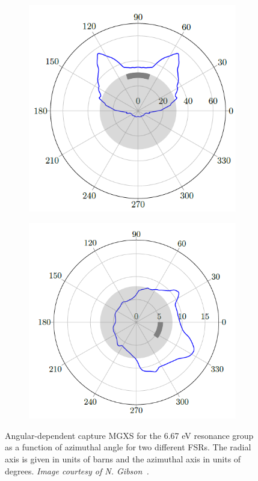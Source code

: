 \documentclass[12pt,twoside]{mitthesis-exec}
\begin{document}
\begin{figure}[h]
\begin{subfigure}{.5\textwidth}
  \centering
  \includegraphics[width=\linewidth]{figures/sph/batman-1}
  \caption{}
  \label{fig:batman-plots-a}
\end{subfigure}
\begin{subfigure}{.5\textwidth}
  \centering
  \includegraphics[width=\linewidth]{figures/sph/batman-2}
  \caption{}
  \label{fig:batman-plots-b}
\end{subfigure}
\caption[Angular-dependent capture MGXS]{Angular-dependent capture MGXS for the 6.67 eV resonance group as a function of azimuthal angle for two different FSRs. The radial axis is given in units of barns and the azimuthal axis in units of degrees. \textit{Image courtesy of N. Gibson~\cite{gibson2016thesis}.}}
\label{fig:batman-plots}
\end{figure}
\end{document}
